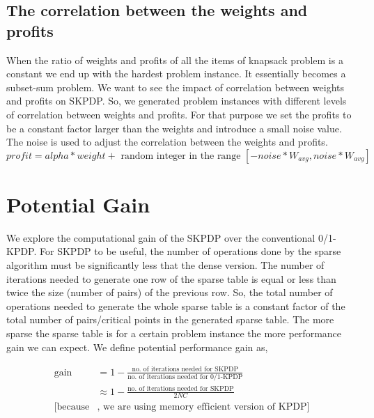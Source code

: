 \subsection{The correlation between the weights and profits}
When the ratio of weights and profits of all the items of knapsack problem is a constant we end up with the hardest problem instance. It essentially becomes a subset-sum problem. We want to see the impact of correlation between weights and profits on SKPDP. So, we generated problem instances with different levels of correlation between weights and profits. For that purpose we set the profits to be a constant factor larger than the weights and introduce a small noise value. The noise is used to adjust the correlation between the weights and profits.
\[
profit = alpha * weight + \text{ random integer in the range } [-noise*W_{avg},noise*W_{avg}]
\]









\section{Potential Gain}
We explore the computational gain of the SKPDP over the conventional 0/1-KPDP.
For SKPDP to be useful, the number of operations done by the sparse algorithm
must be significantly less that the dense version.  The number of iterations
needed to generate one row of the sparse table is equal or less than twice the
size (number of pairs) of the previous row.  So, the total number of
operations needed to generate the whole sparse table is a constant factor of
the total number of pairs/critical points in the generated sparse table.  The
more sparse the sparse table is for a certain problem instance the more
performance gain we can expect.  We define potential performance gain as,

\begin{align}
  \label{eq:2}
  \text{gain} &= 1 - \frac{\text{no.\ of iterations needed for
                SKPDP}}{\text{no.\ of iterations needed for 0/1-KPDP}}
                \nonumber \\
              &\approx 1 - \frac{\text{no. of iterations needed for
                SKPDP}}{2NC} \\
  [\text{because}&\text{, we are using memory efficient version of KPDP}]
                   \nonumber
\end{align}

